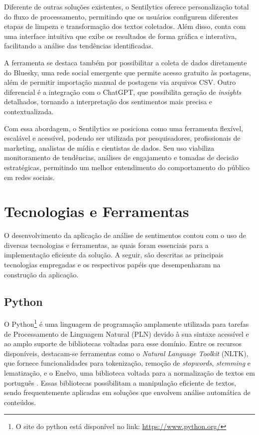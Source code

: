 \documentclass[
	12pt,				%
	oneside,			%
	a4paper,			%
	english,			%
	french,				%
	spanish,			%
	brazil				%
	]{abntex2}
\begin{document}
Diferente de outras soluções existentes, o Sentilytics oferece
personalização total do fluxo de processamento, permitindo que os
usuários configurem diferentes etapas de limpeza e transformação dos
textos coletados. Além disso, conta com uma interface intuitiva que
exibe os resultados de forma gráfica e interativa, facilitando a análise
das tendências identificadas.

A ferramenta se destaca também por possibilitar a coleta de dados
diretamente do Bluesky, uma rede social emergente que permite acesso
gratuito às postagens, além de permitir importação manual de postagens
via arquivos CSV. Outro diferencial é a integração com o ChatGPT, que
possibilita geração de \emph{insights} detalhados, tornando a
interpretação dos sentimentos mais precisa e contextualizada.

Com essa abordagem, o Sentilytics se posiciona como uma ferramenta
flexível, escalável e acessível, podendo ser utilizada por
pesquisadores, profissionais de marketing, analistas de mídia e
cientistas de dados. Seu uso viabiliza monitoramento de tendências,
análises de engajamento e tomadas de decisão estratégicas, permitindo um
melhor entendimento do comportamento do público em redes sociais.

\hypertarget{tecnologias-e-ferramentas}{%
\section{Tecnologias e Ferramentas}\label{tecnologias-e-ferramentas}}

O desenvolvimento da aplicação de análise de sentimentos contou com o
uso de diversas tecnologias e ferramentas, as quais foram essenciais
para a implementação eficiente da solução. A seguir, são descritas as
principais tecnologias empregadas e os respectivos papéis que
desempenharam na construção da aplicação.

\hypertarget{python}{%
\subsection{Python}\label{python}}

O Python\footnote{O site do python está disponível no link:
  \url{https://www.python.org/}} é uma linguagem de programação
amplamente utilizada para tarefas de Processamento de Linguagem Natural
(PLN) devido à sua sintaxe acessível e ao amplo suporte de bibliotecas
voltadas para esse domínio. Entre os recursos disponíveis, destacam-se
ferramentas como o \emph{Natural Language Toolkit} (NLTK), que fornece
funcionalidades para tokenização, remoção de \emph{stopwords},
\emph{stemming} e lematização, e o Enelvo, uma biblioteca voltada para a
normalização de textos em português \cite{bertaglia2016exploring}. Essas
bibliotecas possibilitam a manipulação eficiente de textos, sendo
frequentemente aplicadas em soluções que envolvem análise automática de
conteúdos.
\end{document}
